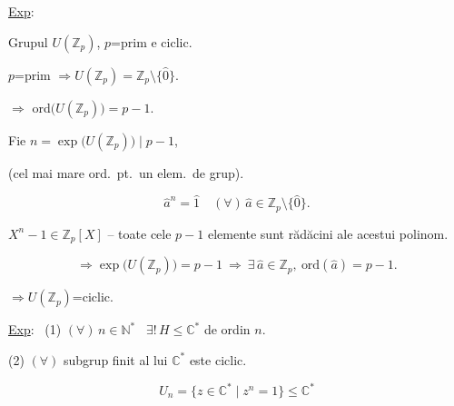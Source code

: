 \bigskip
\noindent\underline{Exp}:

\noindent Grupul $U(\mathbb{Z}_p)$, $p$=prim e ciclic.

\bigskip
\noindent $p$=prim $\Rightarrow U(\mathbb{Z}_p) = \mathbb{Z}_p\setminus\{\hat 0\}$.

\noindent $\Rightarrow$ ord$\big(U(\mathbb{Z}_p)\big)=p-1$.

\bigskip
\noindent Fie $n=\exp\big(U(\mathbb{Z}_p)\big) \mid p-1$,

\noindent \big(cel mai mare ord.\ pt.\ un elem.\ de grup\big).

\[
\hat a^n = \hat 1 \quad (\forall)\,\hat a\in\mathbb{Z}_p\setminus\{\hat 0\}.
\]

\noindent $X^n-1\in\mathbb{Z}_p[X]$ -- toate cele $p-1$ elemente sunt rădăcini ale acestui polinom.

\[
\Rightarrow \exp\big(U(\mathbb{Z}_p)\big) = p-1 \ \Rightarrow \ \exists\,\hat a\in\mathbb{Z}_p, \ \text{ord}(\hat a)=p-1.
\]

\noindent $\Rightarrow U(\mathbb{Z}_p)$=ciclic.

\bigskip
\noindent\underline{Exp}: \ (1) $(\forall)\,n\in\mathbb{N}^*$ \ $\exists!\,H\leq\mathbb{C}^*$ de ordin $n$.

\noindent (2) $(\forall)$ subgrup finit al lui $\mathbb{C}^*$ este ciclic.

\[
U_n = \{z\in\mathbb{C}^* \mid z^n=1\} \leq \mathbb{C}^*
\]
